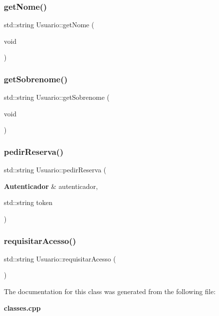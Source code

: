 \subsubsection{get\+Nome()}
{\footnotesize\ttfamily std\+::string Usuario\+::get\+Nome (\begin{DoxyParamCaption}\item[{void}]{ }\end{DoxyParamCaption})\hspace{0.3cm}{\ttfamily [inline]}}

\mbox{\label{class_usuario_ae8583289766b839e0357790d7d7f0353}} 
\subsubsection{get\+Sobrenome()}
{\footnotesize\ttfamily std\+::string Usuario\+::get\+Sobrenome (\begin{DoxyParamCaption}\item[{void}]{ }\end{DoxyParamCaption})\hspace{0.3cm}{\ttfamily [inline]}}

\mbox{\label{class_usuario_a61556dd4f0d1fbdfc7c3eb3722224f7e}} 
\subsubsection{pedir\+Reserva()}
{\footnotesize\ttfamily std\+::string Usuario\+::pedir\+Reserva (\begin{DoxyParamCaption}\item[{\textbf{ Autenticador} \&}]{autenticador,  }\item[{std\+::string}]{token }\end{DoxyParamCaption})\hspace{0.3cm}{\ttfamily [inline]}}

\mbox{\label{class_usuario_a4b20db66d345c36d264f4cf194bcbd49}} 
\subsubsection{requisitar\+Acesso()}
{\footnotesize\ttfamily std\+::string Usuario\+::requisitar\+Acesso (\begin{DoxyParamCaption}{ }\end{DoxyParamCaption})\hspace{0.3cm}{\ttfamily [inline]}}



The documentation for this class was generated from the following file\+:\begin{DoxyCompactItemize}
\item 
\textbf{ classes.\+cpp}\end{DoxyCompactItemize}

